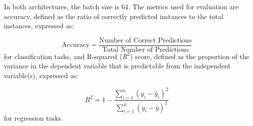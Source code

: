 In both architectures, the batch size is $64$.
The metrics used for evaluation are accuracy, defined as the ratio
of correctly predicted instances to the total instances, expressed as:

\[
\text{{Accuracy}} = \frac{\text{{Number of Correct Predictions}}}{\text{{Total Number of Predictions}}}
\]
for classification tasks, and R-squared ($R^2$) score, defined as the proportion of the variance in the dependent variable that is predictable from the independent variable(s), expressed as:

\[
R^2 = 1 - \frac{\sum_{i=1}^{n} (y_i - \hat{y}_i)^2}{\sum_{i=1}^{n} (y_i - \bar{y})^2}
\]
for regression tasks.